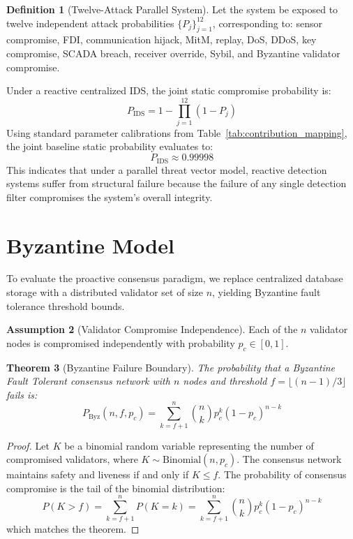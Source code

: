 \documentclass[12pt, oneside, a4paper]{report}
\newtheorem{theorem}{Theorem}[chapter]
\theoremstyle{definition}
\newtheorem{definition}[theorem]{Definition}
\newtheorem{assumption}[theorem]{Assumption}
\theoremstyle{remark}
\newcommand{\Pbyz}{P_{\mathrm{Byz}}}
\newcommand{\Pids}{P_{\mathrm{IDS}}}
\begin{document}
\begin{definition}[Twelve-Attack Parallel System]
Let the system be exposed to twelve independent attack probabilities $\{P_j\}_{j=1}^{12}$, corresponding to: sensor compromise, FDI, communication hijack, MitM, replay, DoS, DDoS, key compromise, SCADA breach, receiver override, Sybil, and Byzantine validator compromise.
\end{definition}

Under a reactive centralized IDS, the joint static compromise probability is:
\begin{equation}
\Pids = 1 - \prod_{j=1}^{12} (1 - P_j)
\end{equation}
Using standard parameter calibrations from Table~\ref{tab:contribution_mapping}, the joint baseline static probability evaluates to:
\begin{equation}
\Pids \approx 0.99998
\end{equation}
This indicates that under a parallel threat vector model, reactive detection systems suffer from structural failure because the failure of any single detection filter compromises the system's overall integrity.

\section{Byzantine Model}
\label{sec:sm:byzantine_model}

To evaluate the proactive consensus paradigm, we replace centralized database storage with a distributed validator set of size $n$, yielding Byzantine fault tolerance threshold bounds.

\begin{assumption}[Validator Compromise Independence]
Each of the $n$ validator nodes is compromised independently with probability $p_c \in [0, 1]$.
\end{assumption}

\begin{theorem}[Byzantine Failure Boundary]
The probability that a Byzantine Fault Tolerant consensus network with $n$ nodes and threshold $f = \lfloor (n-1)/3 \rfloor$ fails is:
\begin{equation}
\Pbyz(n, f, p_c) = \sum_{k=f+1}^{n} \binom{n}{k} p_c^k (1 - p_c)^{n - k}
\end{equation}
\end{theorem}

\begin{proof}
Let $K$ be a binomial random variable representing the number of compromised validators, where $K \sim \mathrm{Binomial}(n, p_c)$. The consensus network maintains safety and liveness if and only if $K \le f$. The probability of consensus compromise is the tail of the binomial distribution:
\begin{equation}
P(K > f) = \sum_{k=f+1}^{n} P(K=k) = \sum_{k=f+1}^{n} \binom{n}{k} p_c^k (1 - p_c)^{n - k}
\end{equation}
which matches the theorem.
\end{proof}
\end{document}
